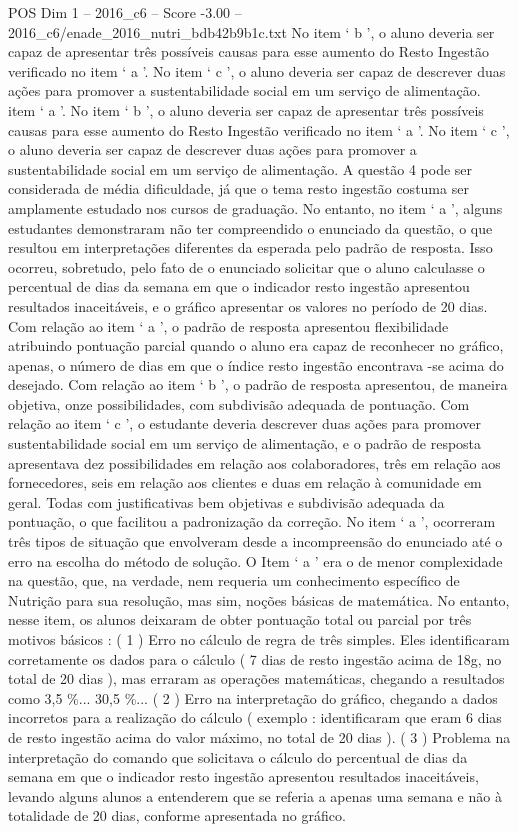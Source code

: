 \begin{textsample}{POS Dim 1 – 2016\_c6 – Score -3.00 – 2016\_c6/enade\_2016\_nutri\_bdb42b9b1c.txt}
No item ‘ b ’, o aluno deveria ser capaz de apresentar três possíveis causas para esse aumento do Resto Ingestão verificado no item ‘ a ’.
No item ‘ c ’, o aluno deveria ser capaz de descrever duas ações para promover a sustentabilidade social em um serviço de alimentação. item ‘ a ’.
No item ‘ b ’, o aluno deveria ser capaz de apresentar três possíveis causas para esse aumento do Resto Ingestão verificado no item ‘ a ’.
No item ‘ c ’, o aluno deveria ser capaz de descrever duas ações para promover a sustentabilidade social em um serviço de alimentação.
A questão 4 pode ser considerada de média dificuldade, já que o tema resto ingestão costuma ser amplamente estudado nos cursos de graduação.
No entanto, no item ‘ a ’, alguns estudantes demonstraram não ter compreendido o enunciado da questão, o que resultou em interpretações diferentes da esperada pelo padrão de resposta.
Isso ocorreu, sobretudo, pelo fato de o enunciado solicitar que o aluno calculasse o percentual de dias da semana em que o indicador resto ingestão apresentou resultados inaceitáveis, e o gráfico apresentar os valores no período de 20 dias.
Com relação ao item ‘ a ’, o padrão de resposta apresentou flexibilidade atribuindo pontuação parcial quando o aluno era capaz de reconhecer no gráfico, apenas, o número de dias em que o índice resto ingestão encontrava -se acima do desejado.
Com relação ao item ‘ b ’, o padrão de resposta apresentou, de maneira objetiva, onze possibilidades, com subdivisão adequada de pontuação.
Com relação ao item ‘ c ’, o estudante deveria descrever duas ações para promover sustentabilidade social em um serviço de alimentação, e o padrão de resposta apresentava dez possibilidades em relação aos colaboradores, três em relação aos fornecedores, seis em relação aos clientes e duas em relação à comunidade em geral.
Todas com justificativas bem objetivas e subdivisão adequada da pontuação, o que facilitou a padronização da correção.
No item ‘ a ’, ocorreram três tipos de situação que envolveram desde a incompreensão do enunciado até o erro na escolha do método de solução.
O Item ‘ a ’ era o de menor complexidade na questão, que, na verdade, nem requeria um conhecimento específico de Nutrição para sua resolução, mas sim, noções básicas de matemática.
No entanto, nesse item, os alunos deixaram de obter pontuação total ou parcial por três motivos básicos : ( 1 ) Erro no cálculo de regra de três simples.
Eles identificaram corretamente os dados para o cálculo ( 7 dias de resto ingestão acima de 18g, no total de 20 dias ), mas erraram as operações matemáticas, chegando a resultados como 3,5 \%... 30,5 \%... ( 2 ) Erro na interpretação do gráfico, chegando a dados incorretos para a realização do cálculo ( exemplo : identificaram que eram 6 dias de resto ingestão acima do valor máximo, no total de 20 dias ). ( 3 ) Problema na interpretação do comando que solicitava o cálculo do percentual de dias da semana em que o indicador resto ingestão apresentou resultados inaceitáveis, levando alguns alunos a entenderem que se referia a apenas uma semana e não à totalidade de 20 dias, conforme apresentada no gráfico.

\end{textsample}
